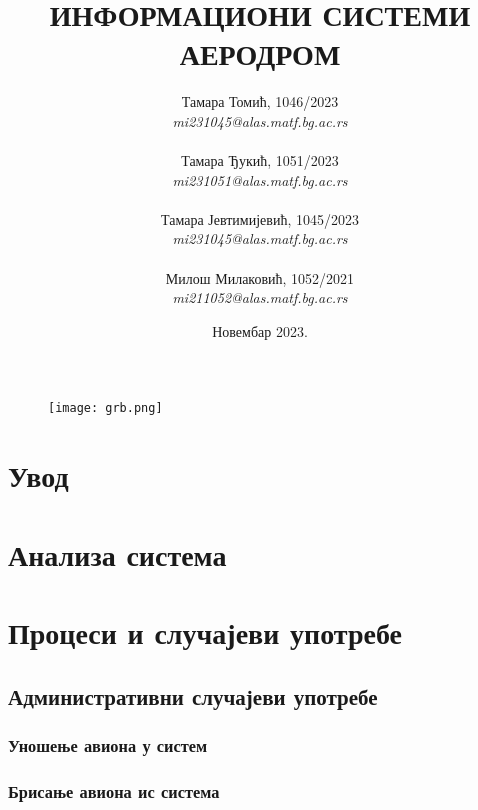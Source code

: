 \documentclass{article}
\title{\textbf{ИНФОРМАЦИОНИ СИСТЕМИ} \\
\vspace{10}
\Large{\textbf{АЕРОДРОМ}}}
\author{Тамара Томић, 1046/2023 \\ \textit{mi231045@alas.matf.bg.ac.rs} \\\\
        Тамара Ђукић, 1051/2023 \\ \textit{mi231051@alas.matf.bg.ac.rs} \\\\
        Тамара Јевтимијевић, 1045/2023 \\ \textit{mi231045@alas.matf.bg.ac.rs} \\\\
        Милош Милаковић, 1052/2021 \\ \textit{mi211052@alas.matf.bg.ac.rs}}
\date{Новембар 2023.}
\begin{document}
\maketitle

\vspace{17}
\begin{figure}[h!]
    \centering
    \texttt{[image: grb.png]}
\end{figure} 

\newpage
\tableofcontents

\newpage

\section{Увод}

\section{Анализа система}

\section{Процеси и случајеви употребе}

\subsection{Административни случајеви употребе}

\subsubsection{Уношење авиона у систем}

\subsubsection{Брисање авиона ис система}
\end{document}
